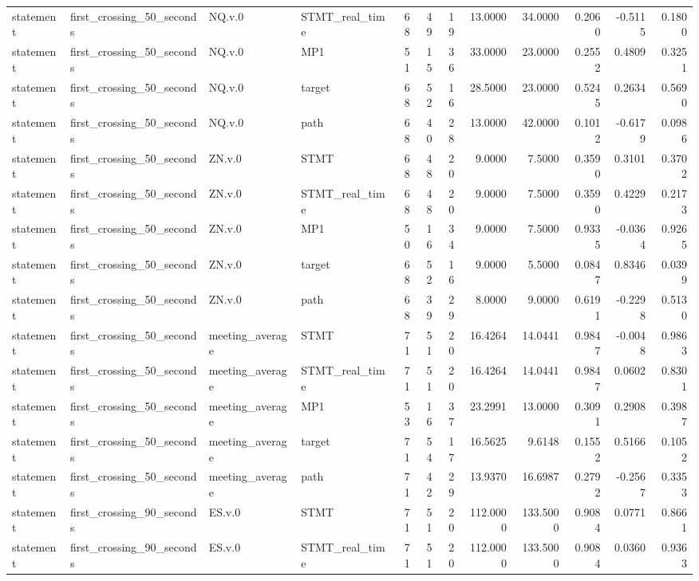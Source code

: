 \begin{tabular}{llllrrrrrrrr}
statement & first_crossing_50_seconds & NQ.v.0 & STMT_real_time & 68 & 49 & 19 & 13.0000 & 34.0000 & 0.2060 & -0.5115 & 0.1800 \\
statement & first_crossing_50_seconds & NQ.v.0 & MP1 & 51 & 15 & 36 & 33.0000 & 23.0000 & 0.2552 & 0.4809 & 0.3251 \\
statement & first_crossing_50_seconds & NQ.v.0 & target & 68 & 52 & 16 & 28.5000 & 23.0000 & 0.5245 & 0.2634 & 0.5690 \\
statement & first_crossing_50_seconds & NQ.v.0 & path & 68 & 40 & 28 & 13.0000 & 42.0000 & 0.1012 & -0.6179 & 0.0986 \\
statement & first_crossing_50_seconds & ZN.v.0 & STMT & 68 & 48 & 20 & 9.0000 & 7.5000 & 0.3590 & 0.3101 & 0.3702 \\
statement & first_crossing_50_seconds & ZN.v.0 & STMT_real_time & 68 & 48 & 20 & 9.0000 & 7.5000 & 0.3590 & 0.4229 & 0.2173 \\
statement & first_crossing_50_seconds & ZN.v.0 & MP1 & 50 & 16 & 34 & 9.0000 & 7.5000 & 0.9335 & -0.0364 & 0.9265 \\
statement & first_crossing_50_seconds & ZN.v.0 & target & 68 & 52 & 16 & 9.0000 & 5.5000 & 0.0847 & 0.8346 & 0.0399 \\
statement & first_crossing_50_seconds & ZN.v.0 & path & 68 & 39 & 29 & 8.0000 & 9.0000 & 0.6191 & -0.2298 & 0.5130 \\
statement & first_crossing_50_seconds & meeting_average & STMT & 71 & 51 & 20 & 16.4264 & 14.0441 & 0.9847 & -0.0048 & 0.9863 \\
statement & first_crossing_50_seconds & meeting_average & STMT_real_time & 71 & 51 & 20 & 16.4264 & 14.0441 & 0.9847 & 0.0602 & 0.8301 \\
statement & first_crossing_50_seconds & meeting_average & MP1 & 53 & 16 & 37 & 23.2991 & 13.0000 & 0.3091 & 0.2908 & 0.3987 \\
statement & first_crossing_50_seconds & meeting_average & target & 71 & 54 & 17 & 16.5625 & 9.6148 & 0.1552 & 0.5166 & 0.1052 \\
statement & first_crossing_50_seconds & meeting_average & path & 71 & 42 & 29 & 13.9370 & 16.6987 & 0.2792 & -0.2567 & 0.3353 \\
statement & first_crossing_90_seconds & ES.v.0 & STMT & 71 & 51 & 20 & 112.0000 & 133.5000 & 0.9084 & 0.0771 & 0.8661 \\
statement & first_crossing_90_seconds & ES.v.0 & STMT_real_time & 71 & 51 & 20 & 112.0000 & 133.5000 & 0.9084 & 0.0360 & 0.9363 \\

\end{tabular}
